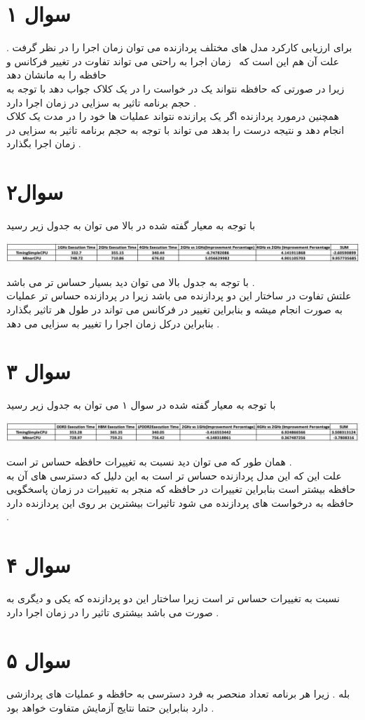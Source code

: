 \documentclass{article}
\begin{document}
\section*{سوال ۱ }
برای ارزیابی کارکرد مدل های مختلف پردازنده می توان زمان اجرا 
 را در نظر گرفت . 
علت آن هم این است که  زمان اجرا  به راحتی می تواند تفاوت در تغییر فرکانس و حافظه را به مانشان دهد \\
زیرا در صورتی که حافظه نتواند یک در خواست را در یک کلاک جواب دهد با توجه به حجم برنامه تاثیر به سزایی در زمان اجرا  دارد . \\
همچنین درمورد پردازنده اگر یک پرازنده نتواند عملیات ها خود را در مدت یک کلاک انجام دهد و نتیجه درست را بدهد می تواند با توجه به حجم برنامه تاثیر به سزایی در زمان اجرا  بگذارد . 
\section*{سوال۲ }
با توجه به معیار گفته شده در بالا می توان به جدول زیر رسید 
\begin{center}
				\includegraphics[width=1\linewidth]{q2p1} 
\end{center}
با توجه به جدول بالا می توان دید
\lr{\textcolor{red}{MinorCPU}}
بسیار حساس تر می باشد . \\
علتش تفاوت در ساختار این دو پردازنده می باشد زیرا در پردازنده حساس تر عملیات به صورت
 انجام میشه و بنابراین تغییر در فرکانس می تواند در طول هر 
تاثیر بگذارد بنابراین درکل زمان اجرا را تغییر به سزایی می دهد  . 
\section*{سوال ۳}
با توجه به معیار گفته شده در سوال ۱ می توان به جدول زیر رسید 
\begin{center}
	\includegraphics[width=1\linewidth]{q3p1} 
\end{center}

همان طور که می توان دید 
\lr{\textcolor{red}{TimingSimpleCPU}}
نسبت به تغییرات حافظه حساس تر است . \\
علت این که این مدل پردازنده حساس تر است به این دلیل که دسترسی های آن به حافظه بیشتر است بنابراین تغییرات در حافظه که منجر به تغییرات در زمان پاسخگویی حافظه به درخواست  های پردازنده می شود تاثیرات بیشترین بر روی این پردازنده دارد . 
\section*{سوال ۴}
نسبت به تغییرات 
حساس تر است زیرا ساختار این دو پردازنده که یکی 
و دیگری به صورت 
می باشد بیشتری تاثیر را در زمان اجرا دارد . 
\section*{سوال ۵}
بله . زیرا هر برنامه تعداد منحصر به فرد دسترسی به حافظه و عملیات های پردازشی دارد بنابراین حتما نتایج آزمایش متفاوت خواهد بود . 
\end{document}
